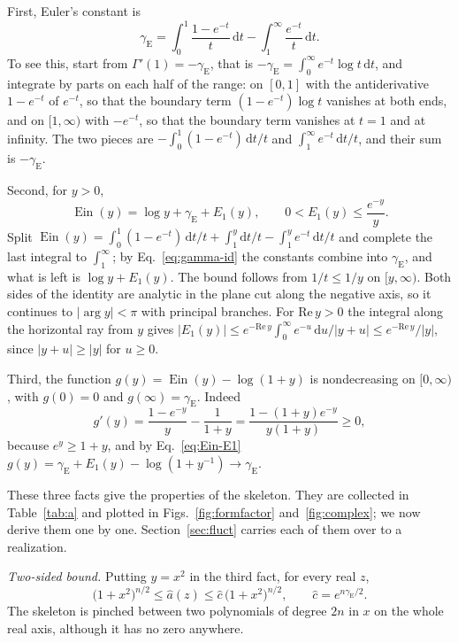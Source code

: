 \documentclass[a4paper,11pt]{article}
\newcommand{\dd}{\mathrm{d}}
\newcommand{\Ein}{\operatorname{Ein}}
\newcommand{\gE}{\gamma_{\mathrm E}}
\begin{document}
First, Euler's constant is
\begin{equation}
\label{eq:gamma-id}
\gE=\int_0^1\frac{1-e^{-t}}{t}\,\dd t-\int_1^\infty\frac{e^{-t}}{t}\,\dd t .
\end{equation}
To see this, start from $\Gamma'(1)=-\gE$, that is $-\gE=\int_0^\infty e^{-t}\log t\,\dd t$, and integrate by parts on each half of the range: on $[0,1]$ with the antiderivative $1-e^{-t}$ of $e^{-t}$, so that the boundary term $(1-e^{-t})\log t$ vanishes at both ends, and on $[1,\infty)$ with $-e^{-t}$, so that the boundary term vanishes at $t=1$ and at infinity. The two pieces are $-\int_0^1(1-e^{-t})\,\dd t/t$ and $\int_1^\infty e^{-t}\,\dd t/t$, and their sum is $-\gE$.

Second, for $y>0$,
\begin{equation}
\label{eq:Ein-E1}
\Ein(y)=\log y+\gE+E_1(y),\qquad 0<E_1(y)\le\frac{e^{-y}}{y}.
\end{equation}
Split $\Ein(y)=\int_0^1(1-e^{-t})\,\dd t/t+\int_1^y\dd t/t-\int_1^ye^{-t}\,\dd t/t$ and complete the last integral to $\int_1^\infty$; by Eq.~\eqref{eq:gamma-id} the constants combine into $\gE$, and what is left is $\log y+E_1(y)$. The bound follows from $1/t\le1/y$ on $[y,\infty)$. Both sides of the identity are analytic in the plane cut along the negative axis, so it continues to $|\arg y|<\pi$ with principal branches. For $\mathrm{Re}\,y>0$ the integral along the horizontal ray from $y$ gives $|E_1(y)|\le e^{-\mathrm{Re}\,y}\int_0^\infty e^{-u}\,\dd u/|y+u|\le e^{-\mathrm{Re}\,y}/|y|$, since $|y+u|\ge|y|$ for $u\ge0$.

Third, the function $g(y)=\Ein(y)-\log(1+y)$ is nondecreasing on $[0,\infty)$, with $g(0)=0$ and $g(\infty)=\gE$. Indeed
\[
g'(y)=\frac{1-e^{-y}}{y}-\frac1{1+y}=\frac{1-(1+y)e^{-y}}{y(1+y)}\ge0,
\]
because $e^{y}\ge1+y$, and by Eq.~\eqref{eq:Ein-E1} $g(y)=\gE+E_1(y)-\log(1+y^{-1})\to\gE$.

These three facts give the properties of the skeleton. They are collected in Table~\ref{tab:a} and plotted in Figs.~\ref{fig:formfactor} and~\ref{fig:complex}; we now derive them one by one. Section~\ref{sec:fluct} carries each of them over to a realization.

\textit{Two-sided bound.} Putting $y=x^2$ in the third fact, for every real $z$,
\begin{equation}
\label{eq:twosided}
\bigl(1+x^2\bigr)^{n/2}\le\hat a(z)\le\hat c\,\bigl(1+x^2\bigr)^{n/2},\qquad\hat c=e^{n\gE/2}.
\end{equation}
The skeleton is pinched between two polynomials of degree $2n$ in $x$ on the whole real axis, although it has no zero anywhere.
\end{document}
